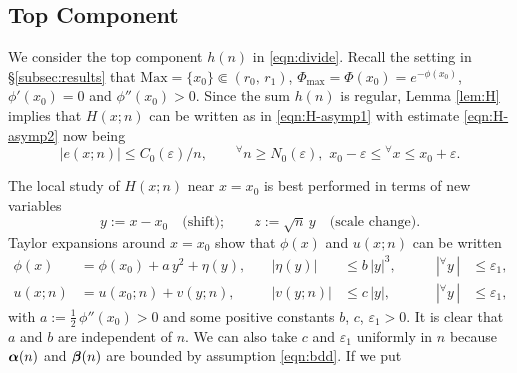 \documentclass[a4paper,12pt]{article}
\theoremstyle{plain}
\def\ve{\varepsilon}
\def\bal{\mbox{\boldmath $\alpha$}}
\def\bbeta{\mbox{\boldmath $\beta$}}
\def\Phim{\Phi_{\scriptstyle \mathrm{max}}}
\def\Mm{\mathrm{M{\scriptstyle ax}}}
\def\ts{\textstyle}
\begin{document}
\subsection{Top Component} \label{subsec:t-s} 
We consider the top component $h(n)$ in \eqref{eqn:divide}. 
Recall the setting in \S \ref{subsec:results} that $\Mm = \{ x_0 \} \Subset 
(r_0, \, r_1)$, $\Phim = \Phi( x_0 ) = e^{- \phi( x_0)}$, $\phi'( x_0 ) = 0$ and 
$\phi''( x_0 ) > 0$. 
Since the sum $h(n)$ is regular, Lemma \ref{lem:H} implies that $H(x; n)$ 
can be written as in \eqref{eqn:H-asymp1} with 
estimate \eqref{eqn:H-asymp2} now being 
\begin{equation} \label{eqn:C0(ve)}
|e( x; n)| \le C_0(\ve)/n, \qquad 
{}^{\forall} n \ge N_0(\ve), \,\, x_0-\ve \le {}^{\forall} x \le x_0+\ve.    
\end{equation}
\par
The local study of $H(x; n)$ near $x = x_0 $ is best performed in terms of 
new variables  
\begin{equation*} 
y := x- x_0 \quad \mbox{(shift)}; \qquad 
z := \sqrt{n} \, y \quad \mbox{(scale change)}. 
\end{equation*} 
Taylor expansions around $x = x_0 $ show that $\phi( x )$ and $u (x; n) $ can 
be written 
\begin{subequations}
\begin{alignat}{3}
\phi(x) &= \phi( x_0 ) + a \, y^2 + \eta( y ), \quad &  
|\eta( y )| &\le b \, |y|^3, \qquad & |{}^{\forall} y \, | &\le \ve_1, 
\label{eqn:taylor-p} \\
u(x; n) &= u( x_0; n) + v( y; n ), \quad &  
|v( y; n )| &\le c \, |y|, \qquad & |{}^{\forall} y \, | &\le \ve_1,  
\label{eqn:taylor-u}    
\end{alignat}
\end{subequations}
with $a := \ts \frac{1}{2} \, \phi''( x_0 ) > 0$ and some positive constants $b$, $c$, 
$\ve_1 > 0$.   
It is clear that $a$ and $b$ are independent of $n$.  
We can also take $c$ and $\ve_1$ uniformly in $n$ because 
$\bal(n)$ and $\bbeta(n)$ are bounded by assumption \eqref{eqn:bdd}. 
If we put 
\end{document}
